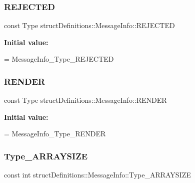 \subsubsection{\texorpdfstring{R\+E\+J\+E\+C\+T\+ED}{REJECTED}}
{\footnotesize\ttfamily const Type struct\+Definitions\+::\+Message\+Info\+::\+R\+E\+J\+E\+C\+T\+ED\hspace{0.3cm}{\ttfamily [static]}}

{\bfseries Initial value\+:}
\begin{DoxyCode}
=
    MessageInfo\_Type\_REJECTED
\end{DoxyCode}
\hypertarget{classstruct_definitions_1_1_message_info_a77efa917826c7dd2eca69fbceb4597fa}{}\label{classstruct_definitions_1_1_message_info_a77efa917826c7dd2eca69fbceb4597fa} 
\subsubsection{\texorpdfstring{R\+E\+N\+D\+ER}{RENDER}}
{\footnotesize\ttfamily const Type struct\+Definitions\+::\+Message\+Info\+::\+R\+E\+N\+D\+ER\hspace{0.3cm}{\ttfamily [static]}}

{\bfseries Initial value\+:}
\begin{DoxyCode}
=
    MessageInfo\_Type\_RENDER
\end{DoxyCode}
\hypertarget{classstruct_definitions_1_1_message_info_a53898c52581bbe7863f04cdae1436905}{}\label{classstruct_definitions_1_1_message_info_a53898c52581bbe7863f04cdae1436905} 
\subsubsection{\texorpdfstring{Type\+\_\+\+A\+R\+R\+A\+Y\+S\+I\+ZE}{Type\_ARRAYSIZE}}
{\footnotesize\ttfamily const int struct\+Definitions\+::\+Message\+Info\+::\+Type\+\_\+\+A\+R\+R\+A\+Y\+S\+I\+ZE\hspace{0.3cm}{\ttfamily [static]}}

